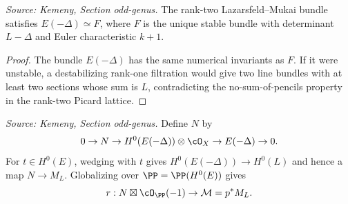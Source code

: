 \begin{lemma}
  \label{lem:kemeny_E_minus_delta_is_F}
  \textit{Source: Kemeny, Section odd-genus.}
  The rank-two Lazarsfeld--Mukai bundle satisfies \(E(-\Delta)\simeq F\), where
  \(F\) is the unique stable bundle with determinant \(L-\Delta\) and Euler
  characteristic \(k+1\).
\end{lemma}
\begin{proof}
  The bundle \(E(-\Delta)\) has the same numerical invariants as \(F\).  If it
  were unstable, a destabilizing rank-one filtration would give two line
  bundles with at least two sections whose sum is \(L\), contradicting the
  no-sum-of-pencils property in the rank-two Picard lattice.
\end{proof}

\begin{definition}
  \label{def:kemeny_odd_kernel_N}
  \textit{Source: Kemeny, Section odd-genus.}
  Define \(N\) by
  \[
    0\to N\to H^0(E(-\Delta))\otimes\cO_X\to E(-\Delta)\to0 .
  \]
  For \(t\in H^0(E)\), wedging with \(t\) gives
  \(H^0(E(-\Delta))\to H^0(L)\) and hence a map \(N\to M_L\).  Globalizing over
  \(\PP=\PP(H^0(E))\) gives
  \[
    r:N\boxtimes\cO_{\PP}(-1)\to \mathcal M=p^*M_L .
  \]
\end{definition}

